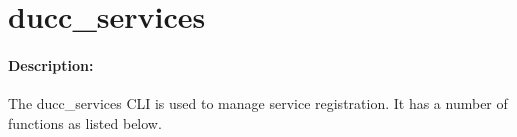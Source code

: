 % 
% 
% 
% 
\ifpdf
\else
{}
\fi
    \section{ducc\_services}
    \label{sec:cli.ducc-services}

    \paragraph{Description:}

        The ducc\_services CLI is used to manage service registration. It has a number of functions 
        as listed below.
        
